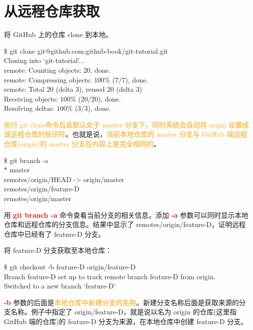 \documentclass[12pt,a4paper]{article}
\begin{document}
\section{从远程仓库获取}
将 GitHub 上的仓库 clone 到本地。
\begin{tcolorbox}[colback=green!5,colframe=green!40!black,title= ]
$\$$ git clone git@github.com:github-book/git-tutorial.git \\
Cloning into `git-tutorial'... \\
remote: Counting objects: $20$, done. \\
remote: Compressing objects: $100\%$ ($7/7$), done. \\
remote: Total $20$ (delta $3$), reused $20$ (delta $3$) \\
Receiving objects: $100\%$ ($20/20$), done. \\
Resolving deltas: $100\%$ ($3/3$), done. \\
\end{tcolorbox}
\textcolor{orange}{执行 git clone命令后会默认处于 master 分支下，同时系统会自动将 origin 设置成该远程仓库的标识符}。也就是说，\textcolor{orange}{当前本地仓库的 master 分支与 GitHub 端远程仓库(origin)的 master 分支在内容上是完全相同的}。
\begin{tcolorbox}[colback=green!5,colframe=green!40!black,title= ]
$\$$ git branch -a \\
$\ast$ master \\
remotes/origin/HEAD -> origin/master \\
remotes/origin/feature-D \\
remotes/origin/master 
\end{tcolorbox}
用 \textcolor{red}{\bf git branch -a} 命令查看当前分支的相关信息。添加 \textcolor{red}{\bf -a} 参数可以同时显示本地仓库和远程仓库的分支信息。结果中显示了 remotes/origin/feature-D，证明远程仓库中已经有了 feature-D 分支。

将 feature-D 分支获取至本地仓库：
\begin{tcolorbox}[colback=green!5,colframe=green!40!black,title= ]
$\$$ git checkout -b feature-D origin/feature-D \\
Branch feature-D set up to track remote branch feature-D from origin. \\
Switched to a new branch `feature-D'
\end{tcolorbox}
 \textcolor{red}{\bf -b} 参数的后面是\textcolor{orange}{本地仓库中新建分支的名称}。新建分支名称后面是获取来源的分支名称。例子中指定了 origin/feature-D，就是说以名为 origin 的仓库(这里指 GitHub 端的仓库)的 feature-D 分支为来源，在本地仓库中创建 feature-D 分支。
\end{document}
